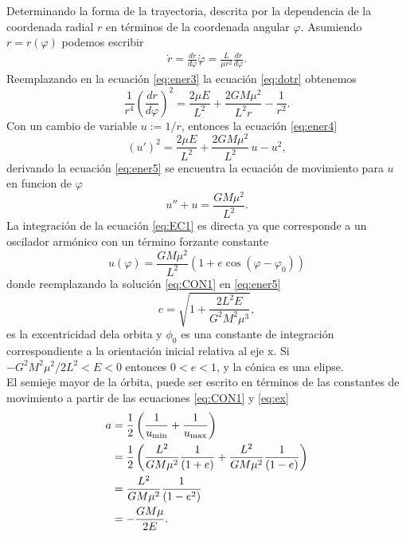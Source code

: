 Determinando la forma de la trayectoria, descrita por la dependencia de la coordenada radial $r$ en términos de la coordenada angular $\varphi$. Asumiendo $r=r(\varphi)$ podemos escribir
\begin{eqnarray}
    \dot{r}=\frac{dr}{d\varphi}\dot{\varphi}=\frac{L}{\mu r^2}\frac{dr}{d\varphi}.
    \label{eq:dotr}
\end{eqnarray}
Reemplazando en la ecuación \ref{eq:ener3} la ecuación \ref{eq:dotr} obtenemos
\begin{equation}
    \frac{1}{r^4}\left(\frac{dr}{d\varphi}\right)^2=\frac{2\mu E}{L^2}+\frac{2GM\mu^2}{L^2r}-\frac{1}{r^2}.\label{eq:ener4}
\end{equation}
Con un cambio de variable $u:=1/r$, entonces la ecuación \ref{eq:ener4}
\begin{equation}
    (u')^2=\frac{2\mu E}{L^2}+\frac{2GM\mu^2}{L^2}\,u-u^{2
    },\label{eq:ener5}
    \end{equation}
derivando la ecuación \ref{eq:ener5} se encuentra la ecuación de movimiento para $u$ en funcion de $\varphi$
\begin{equation}
    u''+u=\frac{GM\mu^2}{L^2}.\label{eq:EC1}
\end{equation}
La integración de la ecuación \ref{eq:EC1} es directa ya que corresponde a un oscilador armónico con un término forzante constante
\begin{equation}
    u(\varphi)=\frac{GM\mu^2}{L^2}\left(1+e\cos
    (\varphi-\varphi_0)\right)\label{eq:CON1}
\end{equation}
donde reemplazando la solución \ref{eq:CON1} en \ref{eq:ener5}
\begin{equation}
    e=\sqrt{1+\frac{2L^2E}{G^2M^2\mu^3}}, \label{eq:ex}
\end{equation}
es la excentricidad dela orbita y $\phi_0$ es una constante de integración correspondiente a la orientación inicial relativa al eje x.
Si $-G^2M^2\mu^2/2L^2<E<0$ entonces $0<e<1$, y la cónica es una elipse.\\
El semieje mayor de la órbita, puede ser escrito en términos de las constantes de movimiento a partir de las ecuaciones \ref{eq:CON1} y \ref{eq:ex}
\begin{align*}
    a & = \frac{1}{2}\left(\frac{1}{u_{\rm min}}+\frac{1}{u_{\rm max}}\right) \\
    & = \frac{1}{2}\left(\frac{L^2}{GM\mu^2}\frac{1}{(1+e)}+\frac{L^2}{GM\mu^2}\frac{1}{(1-e)}\right) \\
    & = \frac{L^2}{GM\mu^2}\frac{1}{(1-e^2)} \\
    & = -\frac{GM\mu}{2E}.
    \end{align*}
